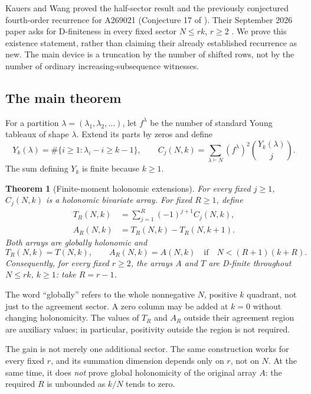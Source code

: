 \documentclass[11pt,letterpaper]{article}
\numberwithin{equation}{section}
\newtheorem{theorem}{Theorem}[section]
\theoremstyle{definition}
\begin{document}
Kauers and Wang proved the half-sector result and the previously
conjectured fourth-order recurrence for A269021 (Conjecture 17 of
\cite{KK}). Their September 2026
paper asks for D-finiteness in every fixed sector $N\le rk$, $r\ge2$
\cite[Sections 1--2]{KW}. We prove this existence statement, rather than
claiming their already established recurrence as new. The main device is
a truncation by the number of shifted rows, not by the number of ordinary
increasing-subsequence witnesses.

\subsection{The main theorem}
For a partition $\lambda=(\lambda_1,\lambda_2,\ldots)$, let $f^\lambda$
be the number of standard Young tableaux of shape $\lambda$. Extend its
parts by zeros and define
\begin{equation}
 Y_k(\lambda)=\#\{i\ge1:\lambda_i-i\ge k-1\},
 \qquad
 C_j(N,k)=\sum_{\lambda\vdash N}(f^\lambda)^2
                   \binom{Y_k(\lambda)}{j}.\label{lis:eq:moments}
\end{equation}
The sum defining $Y_k$ is finite because $k\ge1$.

\begin{theorem}[Finite-moment holonomic extensions]\label{lis:thm:main}
For every fixed $j\ge1$, $C_j(N,k)$ is a holonomic bivariate array.
For fixed $R\ge1$, define
\begin{align}
 T_R(N,k)&=\sum_{j=1}^{R}(-1)^{j+1}C_j(N,k),\label{lis:eq:TR}\\
 A_R(N,k)&=T_R(N,k)-T_R(N,k+1).\label{lis:eq:AR}
\end{align}
Both arrays are globally holonomic and
\begin{equation}
 T_R(N,k)=T(N,k),\qquad A_R(N,k)=A(N,k)
 \quad\text{if}\quad N<(R+1)(k+R).\label{lis:eq:sharpregion}
\end{equation}
Consequently, for every fixed $r\ge2$, the arrays $A$ and $T$ are
D-finite throughout $N\le rk$, $k\ge1$: take $R=r-1$.
\end{theorem}

The word ``globally'' refers to the whole nonnegative $N$, positive $k$
quadrant, not just to the agreement sector. A zero column may be added at
$k=0$ without changing holonomicity. The values of $T_R$ and $A_R$
outside their agreement region are auxiliary values; in particular,
positivity outside the region is not required.

The gain is not merely one additional sector. The same construction
works for every fixed $r$, and its summation dimension depends only on
$r$, not on $N$. At the same time, it does \emph{not} prove global
holonomicity of the original array $A$: the required $R$ is unbounded
as $k/N$ tends to zero.
\end{document}
